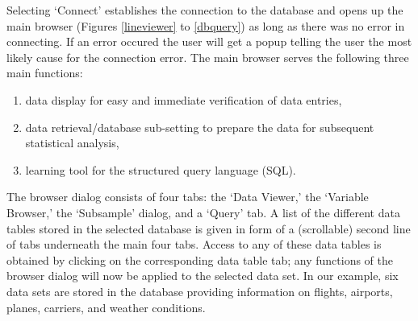 \documentclass[11pt]{tise_style}
\newcommand{\red}[1]{{\color{red} #1}}
\begin{document}

Selecting `Connect' establishes the connection to the database and opens up the main browser (Figures \ref{lineviewer} to \ref{dbquery}) as long as there was no error in connecting.  If an error occured the user will get a popup telling the user the most likely cause for the connection error.  The main browser serves the following three main functions:
\begin{enumerate}
\item data display for easy and immediate verification of data entries, 
\item data retrieval/database sub-setting to prepare the data for subsequent statistical analysis, 
\item learning tool for the structured query language (SQL).
\end{enumerate}

The browser dialog consists of four tabs: the `Data Viewer,' the `Variable Browser,' the `Subsample' dialog, and a `Query' tab.  A list of the different data tables stored in the selected database is given in form of a (scrollable) second line of tabs underneath the main four tabs. Access to any of these data tables is obtained  by clicking on the corresponding data table tab; any functions of the browser dialog will now be applied to the selected data set. In our example, six data sets are stored in the database  providing information on flights, airports, planes, carriers, and weather conditions. 

\end{document}
